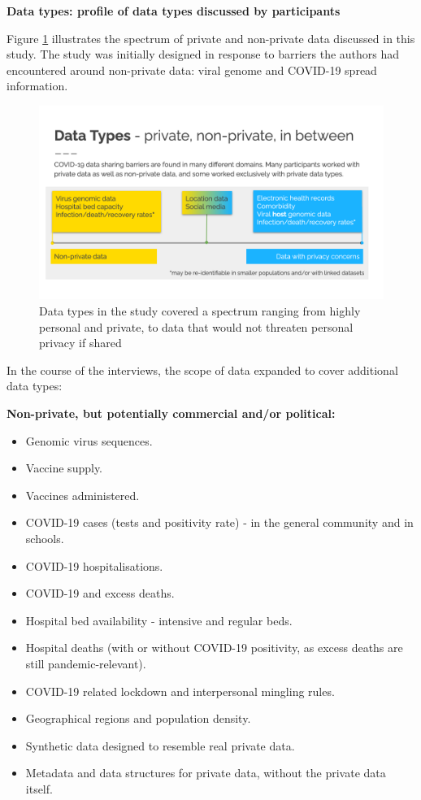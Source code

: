 \documentclass{CUP-JNL-DAP}%
\begin{document}
\textbf{Data types: profile of data types discussed by participants}

Figure \ref{fig:fig-datatypes} illustrates the spectrum of private and non-private data discussed in this study. The study was initially designed in response to barriers the authors had encountered around non-private data: viral genome and COVID-19 spread information. 

\begin{figure}[ht!]
    \centering
    \includegraphics[width=1\linewidth]{figures/figure-datatypes.png}
    \caption{Data types in the study covered a spectrum ranging from highly personal and private, to data that would not threaten personal privacy if shared}
    \label{fig:fig-datatypes}
\end{figure}

In the course of the interviews, the scope of data expanded to cover additional data types: 

\textbf{Non-private, but potentially commercial and/or political:}
\begin{itemize}
\item Genomic virus sequences.
\item Vaccine supply.
\item Vaccines administered.
\item COVID-19 cases (tests and positivity rate) - in the general community and in schools.
\item COVID-19 hospitalisations.
\item COVID-19 and excess deaths.
\item Hospital bed availability - intensive and regular beds.
\item Hospital deaths (with or without COVID-19 positivity, as excess deaths are still pandemic-relevant).
\item COVID-19 related lockdown and interpersonal mingling rules.
\item Geographical regions and population density.
\item Synthetic data designed to resemble real private data.
\item Metadata and data structures for private data, without the private data itself. 
\end{itemize}
\end{document}
